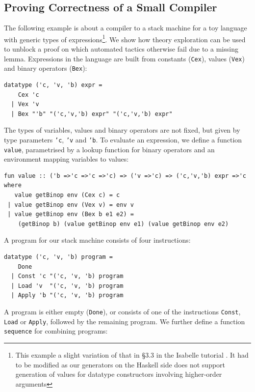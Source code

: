 \subsection{Proving Correctness of a Small Compiler}
\label{sec:comp-ex}
The following example is about a compiler to a stack machine for a toy language with generic types of expressions\footnote{This example a slight variation of that in \S3.3 in the Isabelle tutorial \cite{isabelle}. It had to be modified as our generators on the Haskell side does not support generation of values for datatype constructors involving higher-order arguments}. We show how theory exploration can be used to unblock a proof on which automated tactics otherwise fail due to a missing lemma.
Expressions in the language are built from constants (\texttt{Cex}), values (\texttt{Vex}) and binary operators (\texttt{Bex}): 
\begin{small}
\begin{verbatim}
datatype ('c, 'v, 'b) expr =
    Cex 'c 
  | Vex 'v 
  | Bex "'b" "('c,'v,'b) expr" "('c,'v,'b) expr"
\end{verbatim}
\end{small}
The types of variables, values and binary operators are not fixed, but given by type parameters \texttt{'c}, \texttt{'v} and \texttt{'b}. 
To evaluate an expression, we define a function \texttt{value}, parametrised by a lookup function for binary operators and an environment mapping variables to values:
\begin{small}
\begin{verbatim}
fun value :: ('b =>'c =>'c =>'c) => ('v =>'c) => ('c,'v,'b) expr =>'c
where
   value getBinop env (Cex c) = c
 | value getBinop env (Vex v) = env v
 | value getBinop env (Bex b e1 e2) = 
    (getBinop b) (value getBinop env e1) (value getBinop env e2)
\end{verbatim}
\end{small}
A program for our stack machine consists of four instructions:
\begin{small}
\begin{verbatim}
datatype ('c, 'v, 'b) program =
    Done
  | Const 'c "('c, 'v, 'b) program
  | Load 'v  "('c, 'v, 'b) program
  | Apply 'b "('c, 'v, 'b) program
\end{verbatim}
\end{small}
A program is either empty (\texttt{Done}), or consists of one of the instructions \texttt{Const}, \texttt{Load} or \texttt{Apply}, followed by the remaining program. We further define a function \texttt{sequence} for combining programs:

